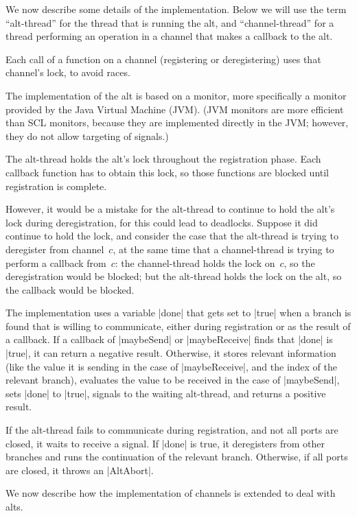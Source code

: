 We now describe some details of the implementation.  Below we will use the
term ``alt-thread'' for the thread that is running the alt, and
``channel-thread'' for a thread performing an operation in a channel that
makes a callback to the alt. 

Each call of a function on a channel (registering or deregistering) uses that
channel's lock, to avoid races.  

The implementation of the alt is based on a monitor, more specifically a
monitor provided by the Java Virtual Machine (JVM).  (JVM monitors are more
efficient than SCL monitors, because they are implemented directly in the JVM;
however, they do not allow targeting of signals.)  

The alt-thread holds the alt's lock throughout the registration phase.  Each
callback function has to obtain this lock, so those functions are blocked
until registration is complete. 

However, it would be a mistake for the alt-thread to continue to hold the
alt's lock during deregistration, for this could lead to deadlocks.  Suppose
it did continue to hold the lock, and consider the case that the alt-thread is
trying to deregister from channel~$c$, at the same time that a channel-thread
is trying to perform a callback from~$c$: the channel-thread holds the lock
on~$c$, so the deregistration would be blocked; but the alt-thread holds the
lock on the alt, so the callback would be blocked.

The implementation uses a variable |done| that gets set to |true| when a
branch is found that is willing to communicate, either during registration or
as the result of a callback.  If a callback of |maybeSend| or |maybeReceive|
finds that |done| is |true|, it can return a negative result.  Otherwise, it
stores relevant information (like the value it is sending in the case of
|maybeReceive|, and the index of the relevant branch), evaluates the value to
be received in the case of |maybeSend|, sets |done| to |true|, signals to the
waiting alt-thread, and returns a positive result.

If the alt-thread fails to communicate during registration, and not all
ports are closed, it waits to receive a signal.  If |done| is true, it
deregisters from other branches and runs the continuation of the relevant
branch.  Otherwise, if all ports are closed, it throws an |AltAbort|. 


We now describe how the implementation of channels is extended to deal with
alts.

